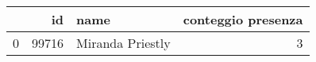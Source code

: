 \begin{tabular}{lrlr}
\toprule
 & id & name & conteggio presenza \\
\midrule
0 & 99716 & Miranda Priestly & 3 \\
\bottomrule
\end{tabular}
